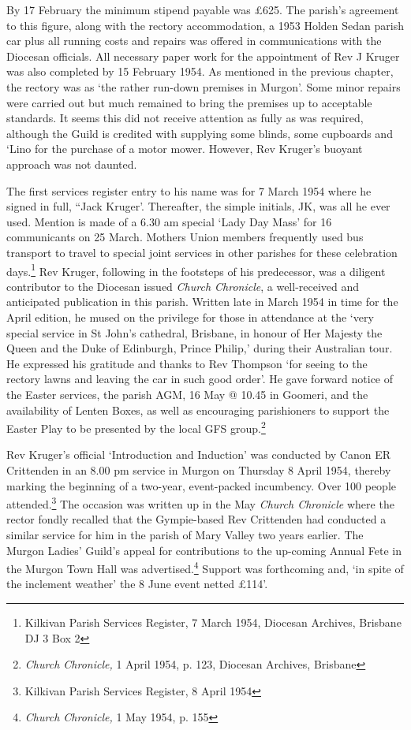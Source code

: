 By 17 February the minimum stipend payable was £625. The parish's agreement to this figure, along with the rectory accommodation, a 1953 Holden Sedan parish car plus all running costs and repairs was offered in communications with the Diocesan officials. All necessary paper work for the appointment of Rev J Kruger was also completed by 15 February 1954. As mentioned in the previous chapter, the rectory was as `the rather run-down premises in Murgon'. Some minor repairs were carried out but much remained to bring the premises up to acceptable standards. It seems this did not receive attention as fully as was required, although the Guild is credited with supplying some blinds, some cupboards and `Lino for the purchase of a motor mower. However, Rev Kruger's buoyant approach was not daunted.

The first services register entry to his name was for 7 March 1954 where he signed in full, ``Jack Kruger'. Thereafter, the simple initials, JK, was all he ever used. Mention is made of a 6.30 am special `Lady Day Mass' for 16 communicants on 25 March. Mothers Union members frequently used bus transport to travel to special joint services in other parishes for these celebration days.\footnote{Kilkivan Parish Services Register, 7 March 1954, Diocesan Archives, Brisbane DJ 3 Box 2} Rev Kruger, following in the footsteps of his predecessor, was a diligent contributor to the Diocesan issued \emph{Church Chronicle}, a well-received and anticipated publication in this parish. Written late in March 1954 in time for the April edition, he mused on the privilege for those in attendance at the `very special service in St John's cathedral, Brisbane, in honour of Her Majesty the Queen and the Duke of Edinburgh, Prince Philip,' during their Australian tour. He expressed his gratitude and thanks to Rev Thompson `for seeing to the rectory lawns and leaving the car in such good order'. He gave forward notice of the Easter services, the parish AGM, 16 May @ 10.45 in Goomeri, and the availability of Lenten Boxes, as well as encouraging parishioners to support the Easter Play to be presented by the local GFS group.\footnote{\emph{Church Chronicle,} 1 April 1954, p. 123, Diocesan Archives, Brisbane}

Rev Kruger's official `Introduction and Induction' was conducted by Canon ER Crittenden in an 8.00 pm service in Murgon on Thursday 8 April 1954, thereby marking the beginning of a two-year, event-packed incumbency. Over 100 people attended.\footnote{Kilkivan Parish Services Register, 8 April 1954} The occasion was written up in the May \emph{Church Chronicle} where the rector fondly recalled that the Gympie-based Rev Crittenden had conducted a similar service for him in the parish of Mary Valley two years earlier. The Murgon Ladies' Guild's appeal for contributions to the up-coming Annual Fete in the Murgon Town Hall was advertised.\footnote{\emph{Church Chronicle,} 1 May 1954, p. 155} Support was forthcoming and, `in spite of the inclement weather' the 8 June event netted £114'.

